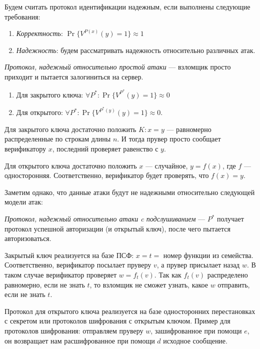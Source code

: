 \begin{definition}
    Будем считать протокол идентификации надежным, если выполнены следующие требования:
    \begin{enumerate}
        \item \emph{Корректность}: \(\Pr\{V^{P(x)}(y) = 1\} \approx 1\)
        \item \emph{Надежность}: будем рассматривать надежность относительно различных атак.
    \end{enumerate}
\end{definition}

\begin{definition}
    \emph{Протокол, надежный относительно простой атаки} --- взломщик просто приходит и пытается залогиниться на сервер.
    \begin{enumerate}
        \item Для закрытого ключа: \(\forall P^*: \Pr\{V^{P^*}(y) = 1\} \approx 0\)
        \item Для открытого: \(\forall P^*: \Pr\{V^{P^*(y)}(y) = 1\} \approx 0\).
    \end{enumerate}
\end{definition}

\begin{example}
    Для закрытого ключа достаточно положить \(K: x = y\) --- равномерно распределенные по строкам длины \(n\). И тогда прувер просто сообщает верификатору \(x\), последний проверяет равенство с \(y\).

    Для открытого ключа достаточно положить \(x\) --- случайное, \(y = f(x)\), где \(f\) --- односторонняя. Соответственно, верификатор будет проверять, что \(f(x) = y\).
\end{example}

Заметим однако, что данные атаки будут не надежными относительно следующей модели атак:

\begin{definition}
    \emph{Протокол, надежный относительно атаки c подслушиванием} --- \(P^*\) получает протокол успешной авторизации (и открытый ключ), после чего пытается авторизоваться.
\end{definition}

\begin{example}
    Закрытый ключ реализуется на базе ПСФ: \(x = t = \) номер функции из семейства. Соответственно, верификатор посылает пруверу \(v\), а прувер присылает назад \(w\). В таком случае верификатор проверяет \(w = f_t(v)\). Так как \(f_t(v)\) распределено равномерно, если не знать \(t\), то взломщик не сможет узнать, какое \(w\) отправить, если не знать \(t\).

    Протокол для открытого ключа реализуется на базе односторонних перестановках с секретом или протоколов шифрования с открытым ключом. Пример для протоколов шифрования: отправляем пруверу \(w\), зашифрованное при помощи \(e\), он возвращает нам расшифрованное при помощи \(d\) исходное сообщение.
\end{example}

